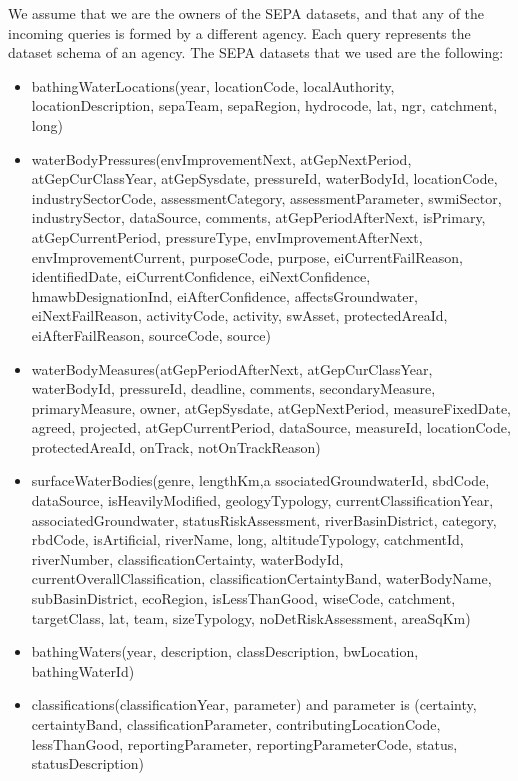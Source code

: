 \documentclass[a4paper,10pt]{article}
\begin{document}
 We assume that we are the owners of the SEPA datasets, and that 
any of the incoming queries is formed by a different agency. Each query represents the dataset schema of an agency.
The SEPA datasets that we used are the following:
\begin{itemize}
\item bathingWaterLocations(year, locationCode, localAuthority, locationDescription, sepaTeam, sepaRegion, hydrocode, lat, ngr, catchment, long)
\item waterBodyPressures(envImprovementNext, atGepNextPeriod, atGepCurClassYear, atGepSysdate, pressureId, waterBodyId, locationCode, industrySectorCode, assessmentCategory, assessmentParameter, swmiSector, industrySector, dataSource, comments, atGepPeriodAfterNext, isPrimary, atGepCurrentPeriod, pressureType, envImprovementAfterNext, envImprovementCurrent, purposeCode, purpose, eiCurrentFailReason, identifiedDate, eiCurrentConfidence, eiNextConfidence, hmawbDesignationInd, eiAfterConfidence, affectsGroundwater, eiNextFailReason, activityCode, activity, swAsset, protectedAreaId, eiAfterFailReason, sourceCode, source)
\item waterBodyMeasures(atGepPeriodAfterNext, atGepCurClassYear, waterBodyId, pressureId, deadline, comments, secondaryMeasure, primaryMeasure, owner, atGepSysdate, atGepNextPeriod, measureFixedDate, agreed, projected, atGepCurrentPeriod, dataSource, measureId, locationCode, protectedAreaId, onTrack, notOnTrackReason)
\item surfaceWaterBodies(genre, lengthKm,a ssociatedGroundwaterId, sbdCode, dataSource, isHeavilyModified, geologyTypology, currentClassificationYear, associatedGroundwater, statusRiskAssessment, riverBasinDistrict, category, rbdCode, isArtificial, riverName, long, altitudeTypology, catchmentId, riverNumber, classificationCertainty, waterBodyId, currentOverallClassification, classificationCertaintyBand, waterBodyName, subBasinDistrict, ecoRegion, isLessThanGood, wiseCode, catchment, targetClass, lat, team, sizeTypology, noDetRiskAssessment, areaSqKm)
\item bathingWaters(year, description, classDescription, bwLocation, bathingWaterId)
\item classifications(classificationYear, parameter)  and parameter is  (certainty, certaintyBand, classificationParameter, contributingLocationCode, lessThanGood, reportingParameter, reportingParameterCode, status, statusDescription) 
\end{itemize}
\end{document}
